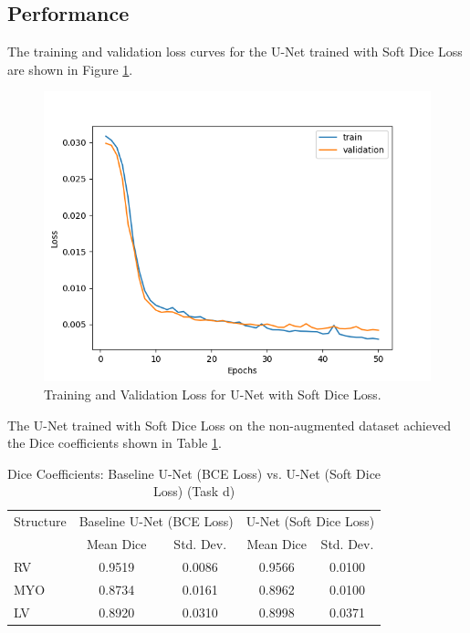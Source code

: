 \documentclass{article}
\begin{document}
\subsection{Performance}
The training and validation loss curves for the U-Net trained with Soft Dice Loss are shown in Figure \ref{fig:soft_dice_loss_curve}.
\begin{figure}[H]
  \centering
  \includegraphics[width=0.8\linewidth]{../result/soft_dice_loss.png}
  \caption{Training and Validation Loss for U-Net with Soft Dice Loss.}
  \label{fig:soft_dice_loss_curve}
\end{figure}

The U-Net trained with Soft Dice Loss on the non-augmented dataset achieved the Dice coefficients shown in Table \ref{tab:soft_dice_unet_comparison}.
\begin{table}[H]
  \centering
  \caption{Dice Coefficients: Baseline U-Net (BCE Loss) vs. U-Net (Soft Dice Loss) (Task d)}
  \label{tab:soft_dice_unet_comparison}
  \begin{tabular}{l|cc|cc}
    \toprule
    Structure & \multicolumn{2}{c|}{Baseline U-Net (BCE Loss)} & \multicolumn{2}{c}{U-Net (Soft Dice Loss)}                         \\
              & Mean Dice                                      & Std. Dev.                                  & Mean Dice & Std. Dev. \\
    \midrule
    RV        & 0.9519                                         & 0.0086                                     & 0.9566    & 0.0100    \\
    MYO       & 0.8734                                         & 0.0161                                     & 0.8962    & 0.0100    \\
    LV        & 0.8920                                         & 0.0310                                     & 0.8998    & 0.0371    \\
    \bottomrule
  \end{tabular}
\end{table}
\end{document}

